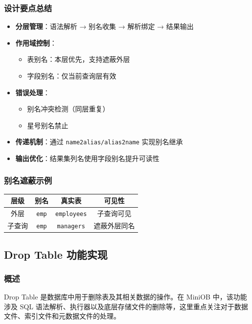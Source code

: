 \documentclass[a4paper, 12pt]{article}
\begin{document}
\subsubsection*{设计要点总结}
\begin{itemize}
    \item \textbf{分层管理}：语法解析 → 别名收集 → 解析绑定 → 结果输出
    \item \textbf{作用域控制}：
    \begin{itemize}
        \item 表别名：本层优先，支持遮蔽外层
        \item 字段别名：仅当前查询层有效
    \end{itemize}
    \item \textbf{错误处理}：
    
\begin{itemize}
        \item 别名冲突检测（同层重复）
        \item 星号别名禁止
    \end{itemize}
    \item \textbf{传递机制}：通过 \texttt{name2alias/alias2name} 实现别名继承
    \item \textbf{输出优化}：结果集列名使用字段别名提升可读性
\end{itemize}

\subsubsection*{别名遮蔽示例}
\begin{center}
\begin{tabular}{|c|c|c|c|}
    \hline
    \textbf{层级} & \textbf{别名} & \textbf{真实表} & \textbf{可见性} \\
    \hline
    外层 & \texttt{emp} & \texttt{employees} & 子查询可见 \\
    \hline
    子查询 & \texttt{emp} & \texttt{managers} & 遮蔽外层同名 \\
    \hline
\end{tabular}
\end{center}

\subsection{\heiti Drop Table 功能实现}

\subsubsection{概述}
Drop Table 是数据库中用于删除表及其相关数据的操作。在 MiniOB 中，该功能涉及 SQL 语法解析、执行器以及底层存储文件的删除等，这里重点关注对于数据文件、索引文件和元数据文件的处理。
\end{document}
